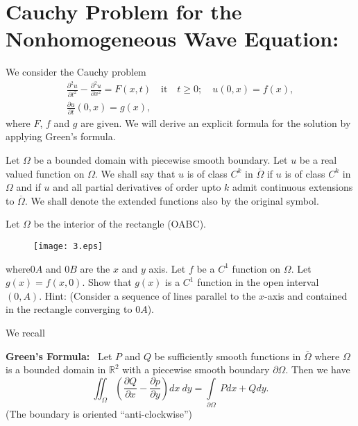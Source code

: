 \section{Cauchy Problem for the Nonhomogeneous Wave Equation:}

We consider the Cauchy problem
\begin{gather*}
\frac{\partial^{2}u}{\partial t^{2}}-\frac{\partial^{2}u}{\partial x^{2}}=F(x,t)\quad\text{it}\quad t\geq 0;\quad u(0,x)=f(x),\\[4pt]
\frac{\partial u}{\partial t}(0,x)=g(x),
\end{gather*}
where $F$, $f$ and $g$ are given. We will derive an explicit formula for the solution by applying Green's formula.

Let $\Omega$ be a bounded domain with piecewise smooth boundary. Let $u$ be a real valued function on $\Omega$. We shall say that $u$ is of class $C^{k}$ in $\overline{\Omega}$ if $u$ is of class $C^{k}$ in $\Omega$ and if $u$ and all partial derivatives of order upto $k$ admit continuous extensions to $\overline{\Omega}$. We shall denote the extended functions also by the original symbol.

\begin{exer*}
Let $\Omega$ be the interior of the rectangle (OABC).
\begin{figure}[H]
\centering
\texttt{[image: 3.eps]}
\end{figure}
\noindent
where\pageoriginale $0A$ and $0B$ are the $x$ and $y$ axis. Let $f$ be a $C^{1}$ function on $\Omega$. Let $g(x)=f(x,0)$. Show that $g(x)$ is a $C^{1}$ function in the open interval $(0,A)$. Hint: (Consider a sequence of lines parallel to the $x$-axis and contained in the rectangle converging to $0A$).
\end{exer*}

We recall

\medskip
\noindent
{\bf Green's Formula:}~ Let $P$ and $Q$ be sufficiently smooth functions in $\overline{\Omega}$ where $\Omega$ is a bounded domain in $\mathbb{R}^{2}$ with a piecewise smooth boundary $\partial \Omega$. Then we have
$$
\iint_{\Omega}\left(\frac{\partial Q}{\partial x}-\frac{\partial p}{\partial y}\right)dx \ dy =\int\limits_{\partial \Omega}\ Pdx +Qdy.
$$
(The boundary is oriented ``anti-clockwise'')

